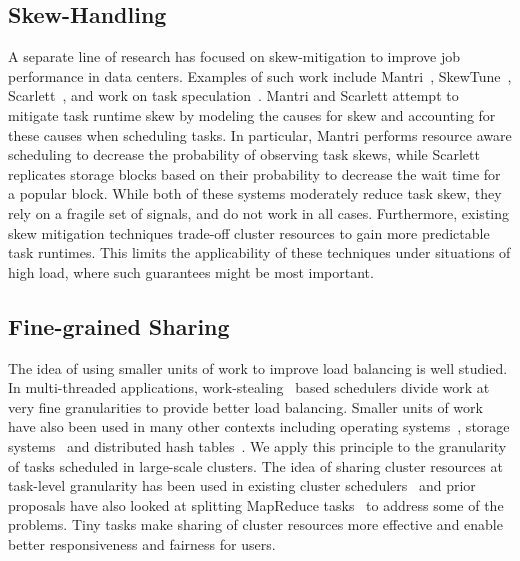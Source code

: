 \subsection{Skew-Handling}
A separate line of research has focused on skew-mitigation to improve job
performance in data centers. Examples of such work include
Mantri~\cite{ananthanarayanan2010reining}, SkewTune~\cite{kwon2012skewtune},
Scarlett~\cite{ananthanarayanan2011scarlett}, and work on task
speculation~\cite{zaharia2008improving}. Mantri and Scarlett attempt to
mitigate task runtime skew by modeling the causes for skew and accounting for
these causes when scheduling tasks. In particular, Mantri performs resource aware scheduling to decrease the
probability of observing task skews, while Scarlett replicates storage blocks
based on their probability to decrease the wait time for a popular block. While
both of these systems moderately reduce task skew, they rely on a fragile set of
signals, and do not work in all cases.
Furthermore, existing skew mitigation techniques trade-off cluster resources to
gain more predictable task runtimes. This limits the applicability of these
techniques under situations of high load, where such guarantees might be most
important.

\subsection{Fine-grained Sharing}
The idea of using smaller units of work to improve load balancing is well
studied.  In multi-threaded applications, work-stealing~\cite{blumofe1994scheduling}
based schedulers divide work at very fine granularities to provide better load
balancing.  Smaller units of work have also been used in many other contexts
including operating systems~\cite{sherman1972trace}, storage systems~\cite{ghemawat2003google,
chang2008bigtable} and distributed hash tables~\cite{stoica2001chord}. We apply this
principle to the granularity of tasks scheduled in large-scale clusters.  The
idea of sharing cluster resources at task-level granularity has been used in
existing cluster schedulers~\cite{hindman2011mesos, zaharia2010delay} and prior
proposals have also looked at splitting MapReduce tasks~\cite{bhatotia2011incoop} to
address some of the problems. Tiny tasks make sharing of cluster resources
more effective and enable better responsiveness and fairness for users.


